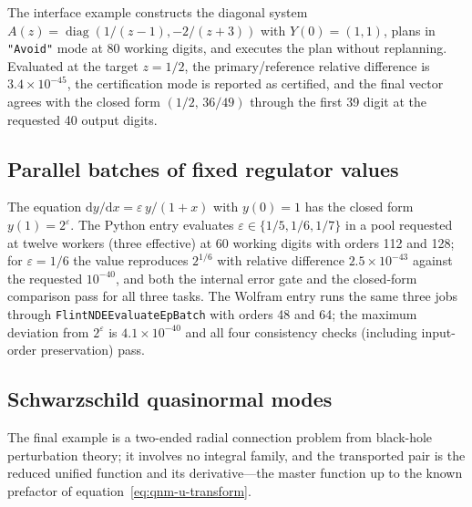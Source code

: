 \documentclass[11pt,a4paper]{article}
\newcommand{\dd}{\mathrm d}
\newcommand{\diag}{\operatorname{diag}}
\begin{document}
The interface example constructs the diagonal system
$A(z)=\diag(1/(z-1),-2/(z+3))$ with $Y(0)=(1,1)$, plans in \texttt{"Avoid"} mode at 80
working digits, and executes the plan without replanning. Evaluated at the target
$z=1/2$, the primary/reference relative
difference is $3.4\times10^{-45}$, the certification mode is reported as certified, and
the final vector agrees with the closed form $(1/2,\,36/49)$ through the first 39
digit at the requested 40 output digits.

\subsection{Parallel batches of fixed regulator values}
\label{sec:example-parallel}

The equation $\dd y/\dd x=\varepsilon\,y/(1+x)$ with $y(0)=1$ has the closed form
$y(1)=2^{\varepsilon}$. The Python entry evaluates $\varepsilon\in\{1/5,1/6,1/7\}$ in a
pool requested at twelve workers (three effective) at 60 working digits with orders 112
and 128; for $\varepsilon=1/6$ the value reproduces $2^{1/6}$ with relative difference
$2.5\times10^{-43}$ against the requested $10^{-40}$, and both the internal error gate
and the closed-form comparison pass for all three tasks. The Wolfram entry runs the same
three jobs through \texttt{FlintNDEEvaluateEpBatch} with orders 48 and 64; the maximum
deviation from $2^{\varepsilon}$ is $4.1\times10^{-40}$ and all four consistency checks
(including input-order preservation) pass.

\subsection{Schwarzschild quasinormal modes}
\label{sec:example-qnm}

The final example is a two-ended radial connection problem from black-hole perturbation
theory; it involves no integral family, and the transported pair is the reduced unified
function and its derivative---the master function up to the known prefactor of
equation~\eqref{eq:qnm-u-transform}.
\end{document}
